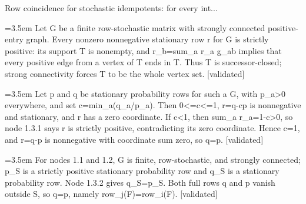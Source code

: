 \documentclass{article}
\newcommand{\step}[1]{\par\noindent\hangindent=3.5em\hangafter=1%
  \makebox[3.5em][l]{\textbf{#1.}}}
\newcommand{\steptag}[1]{\hfill{\small\textsf{[#1]}}}
\begin{document}
\begin{proofbox}{Row coincidence for stochastic idempotents: for every int...}
\step{1.3.1} Let G be a finite row-stochastic matrix with strongly connected positive-entry graph. Every nonzero nonnegative stationary row r for G is strictly positive: its support T is nonempty, and r\_b=sum\_a r\_a g\_ab implies that every positive edge from a vertex of T ends in T. Thus T is successor-closed; strong connectivity forces T to be the whole vertex set. \steptag{validated} \\[4pt]
\step{1.3.2} Let p and q be stationary probability rows for such a G, with p\_a>0 everywhere, and set c=min\_a(q\_a/p\_a). Then 0<=c<=1, r=q-cp is nonnegative and stationary, and r has a zero coordinate. If c<1, then sum\_a r\_a=1-c>0, so node 1.3.1 says r is strictly positive, contradicting its zero coordinate. Hence c=1, and r=q-p is nonnegative with coordinate sum zero, so q=p. \steptag{validated} \\[4pt]
\step{1.3.3} For nodes 1.1 and 1.2, G is finite, row-stochastic, and strongly connected; p\_S is a strictly positive stationary probability row and q\_S is a stationary probability row. Node 1.3.2 gives q\_S=p\_S. Both full rows q and p vanish outside S, so q=p, namely row\_j(F)=row\_i(F). \steptag{validated} \\[4pt]
\end{proofbox}
\end{document}
